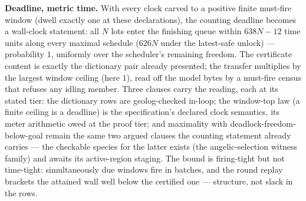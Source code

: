 {\smallskip
\noindent\textbf{Deadline, metric time.} With every clock carved to
a positive finite must-fire window (dwell exactly one at these
declarations), the counting deadline becomes a wall-clock statement:
all $N$ lots enter the finishing queue within $638N - 12$ time units
along every maximal schedule ($626N$ under the latest-safe unlock)
--- probability $1$, uniformly over the scheduler's remaining
freedom. The certificate content is exactly the dictionary pair
already presented; the transfer multiplies by the largest window
ceiling (here $1$), read off the model bytes by a must-fire census
that refuses any idling member. Three clauses carry the reading,
each at its stated tier: the dictionary rows are geolog-checked
in-loop; the window-top law (a finite ceiling is a deadline) is the
specification's declared clock semantics, its meter arithmetic owed
at the proof tier; and maximality with deadlock-freedom-below-goal
remain the same two argued clauses the counting statement already
carries --- the checkable species for the latter exists (the
angelic-selection witness family) and awaits its active-region
staging. The bound is firing-tight but not time-tight:
simultaneously due windows fire in batches, and the round replay
brackets the attained wall well below the certified one ---
structure, not slack in the rows.

}
